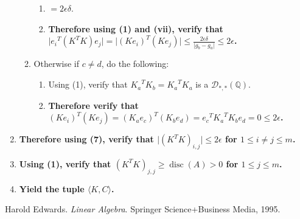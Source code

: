 \documentclass[twocolumn]{article}
\DeclareMathOperator{\disc}{disc}
\begin{document}
\begin{enumerate}
\begin{enumerate}
\begin{enumerate}
							\item $=2\epsilon\delta$.
							\item \textbf{Therefore using (1) and (vii), verify that $\lvert {e_i}^T(K^TK)e_j\rvert=\lvert(Ke_i)^T(Ke_j)\rvert\le\frac{2\epsilon\delta}{\lvert g_b-g_a\rvert}\le 2\epsilon$.}
						\end{enumerate}
						\item Otherwise if $c\ne d$, do the following:
						\begin{enumerate}
							\item Using (1), verify that ${K_a}^TK_b={K_a}^TK_a$ is a $\mathcal{D}_{*,*}(\mathbb{Q})$.
							\item \textbf{Therefore verify that $(Ke_i)^T(Ke_j)=(K_ae_c)^T(K_be_d)={e_c}^T{K_a}^TK_be_d=0\le 2\epsilon$.}
						\end{enumerate}
					\end{enumerate}
					\item \textbf{Therefore using (7), verify that $\lvert(K^TK)_{i,j}\rvert\le 2\epsilon$ for $1\le i\ne j\le m$.}
					\item \textbf{Using (1), verify that $(K^TK)_{j,j}\ge\disc(A)>0$ for $1\le j\le m$.}
					\item \textbf{Yield the tuple $\langle K,C\rangle$.}
				\end{enumerate}
	\begin{thebibliography}{9}
			Harold Edwards.
			\textit{Linear Algebra}. 
			Springer Science+Business Media, 1995.
	\end{thebibliography}
\end{document}
